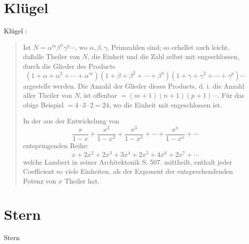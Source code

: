 \documentclass{amsart}
\begin{document}
\section{Kl\"ugel}
Kl\"ugel \cite[pp.~52--53, s.v. ``Theiler einer Zahl'', \S 12]{klugel}:

\begin{quote}
Ist $N=\alpha^m \beta^n \gamma^p\cdots$, wo $\alpha,\beta,\gamma$, Primzahlen sind; so erhellet auch leicht, da\ss alle Theiler
von $N$, die Einheit und die Zahl selbst mit engeschlossen, durch die Glieder des Products
\[
(1+\alpha+\alpha^2+\cdots+\alpha^m)(1+\beta+\beta^2+\cdots+\beta^n)(1+\gamma+\gamma^2+\cdots+\gamma^p)\cdots
\]
argestelle werden. Die Anzahl der Glieder dieses Products, d. i. die Anzahl aller Theiler von $N$, ist offenbar 
$=(m+1)(n+1)(p+1)\cdots$. F\"ur das obige Beispiel $=4\cdot 3 \cdot 2=24$, wo die Einheit mit engeschlossen ist.

In der aus der Entwickelung von
\[
\frac{x}{1-x}+\frac{x^2}{1-x^2}+\frac{x^3}{1-x^3}+\cdots+\frac{x^n}{1-x^n}+\cdots
\]
entspringenden Reihe:
\[
x+2x^2+2x^3+3x^4+2x^5+4x^6+2x^7+\cdots
\]
welche Lambert in seiner Architektonik S. 507. mittheilt, enthalt jeder Coefficient so viele Einheiten, als der Exponent der
entsprechendenden Potenz von $x$ Theiler hat.
\end{quote}



\section{Stern}
Stern \cite{stern}
\end{document}
